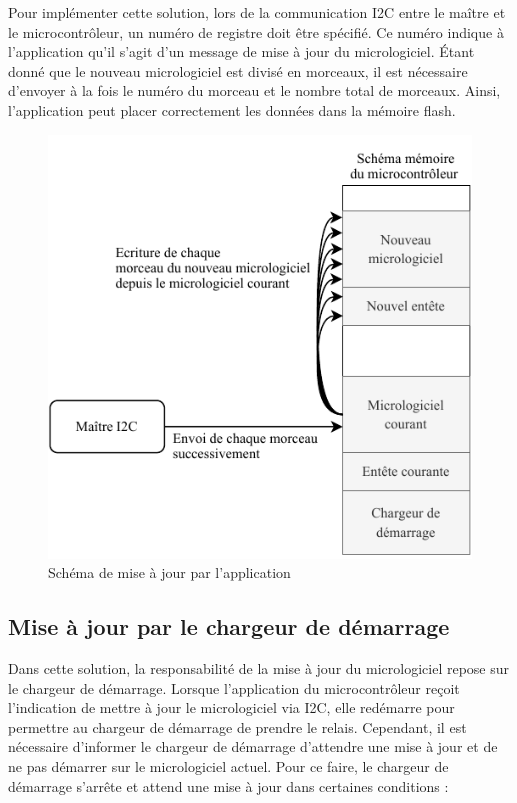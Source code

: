 Pour implémenter cette solution, lors de la communication I2C entre le maître et le microcontrôleur, un numéro de registre doit être spécifié.
Ce numéro indique à l'application qu'il s'agit d'un message de mise à jour du micrologiciel.
Étant donné que le nouveau micrologiciel est divisé en morceaux, il est nécessaire d'envoyer à la fois le numéro du morceau et le nombre total de morceaux.
Ainsi, l'application peut placer correctement les données dans la mémoire flash.

\begin{figure}[H]
    \centering
    \includegraphics[scale=1.3]{./assets/figures/firmware_update.pdf}
    \caption{Schéma de mise à jour par l'application}
\end{figure}

\subsection{Mise à jour par le chargeur de démarrage}

Dans cette solution, la responsabilité de la mise à jour du micrologiciel repose sur le chargeur de démarrage.
Lorsque l'application du microcontrôleur reçoit l'indication de mettre à jour le micrologiciel via I2C, elle redémarre pour permettre au chargeur de démarrage de prendre le relais.
Cependant, il est nécessaire d'informer le chargeur de démarrage d'attendre une mise à jour et de ne pas démarrer sur le micrologiciel actuel.
Pour ce faire, le chargeur de démarrage s'arrête et attend une mise à jour dans certaines conditions :

